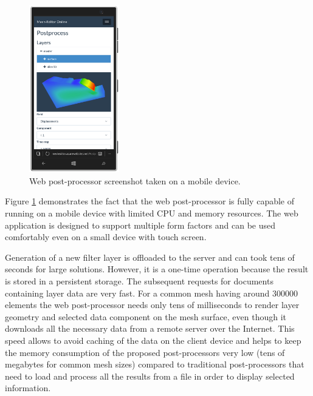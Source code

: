 \begin{figure}[H]
    \centering
    \includegraphics[width=0.35\textwidth]{figures/chapter-data-management/web-postprocessor-mobile}
    \decoRule
    \caption{Web post-processor screenshot taken on a mobile device.}
    \label{fig:web-postprocessor-mobile}
\end{figure}

Figure \ref{fig:web-postprocessor-mobile} demonstrates the fact that the web post-processor is fully capable of running on a mobile device with limited CPU and memory resources. The web application is designed to support multiple form factors and can be used comfortably even on a small device with touch screen.

Generation of a new filter layer is offloaded to the server and can took tens of seconds for large solutions. However, it is a one-time operation because the result is stored in a persistent storage. The subsequent requests for documents containing layer data are very fast. For a common mesh having around 300000 elements the web post-processor needs only tens of milliseconds to render layer geometry and selected data component on the mesh surface, even though it downloads all the necessary data from a remote server over the Internet. This speed allows to avoid caching of the data on the client device and helps to keep the memory consumption of the proposed post-processors very low (tens of megabytes for common mesh sizes) compared to traditional post-processors that need to load and process all the results from a file in order to display selected information.
